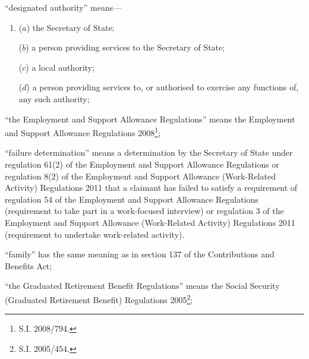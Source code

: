 \documentclass[12pt,a4paper]{article}
\begin{document}
\begin{enumerate}
“designated authority” means—
\begin{enumerate}\item[]
    ($a$)     the Secretary of State;

    ($b$) 
    a person providing services to the Secretary of State;

    ($c$) 
    a local authority;

    ($d$) 
    a person providing services to, or authorised to exercise any functions of, any such authority;
\end{enumerate}

“the Employment and Support Allowance Regulations” means the Employment and Support Allowance Regulations 2008\footnote{S.I. 2008/794.};


“failure determination” means a determination by the Secretary of State under regulation 61(2) of the Employment and Support Allowance Regulations or regulation 8(2) of the Employment and Support Allowance (Work-Related Activity) Regulations 2011 that a claimant has failed to satisfy a requirement of regulation 54 of the Employment and Support Allowance Regulations (requirement to take part in a work-focused interview) or regulation 3 of the Employment and Support Allowance (Work-Related Activity) Regulations 2011 (requirement to undertake work-related activity).

“family” has the same meaning as in section 137 of the Contributions and Benefits Act;


“the Graduated Retirement Benefit Regulations” means the Social Security (Graduated Retirement Benefit) Regulations 2005\footnote{S.I. 2005/454.};


\end{enumerate}
\end{document}
